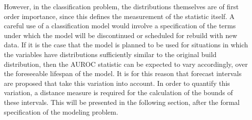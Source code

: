 However, in the classification problem, the distributions themselves are of first order importance, since this defines the measurement of the statistic itself.
A careful use of a classification model would involve a specification of the terms under which the model will be discontinued or scheduled for rebuild with new data.
If it is the case that the model is planned to be used for situations in which the variables have distributions sufficiently similar to the original build distribution, then the AUROC statistic can be expected to vary accordingly, over the foreseeable lifespan of the model.
It is for this reason that forecast intervals are proposed that take this variation into account.
%
%
In order to quantify this variation, a distance measure is required for the calculation of the bounds of these intervals.
%
%
This will be presented in the following section, after the formal specification of the modeling problem.



